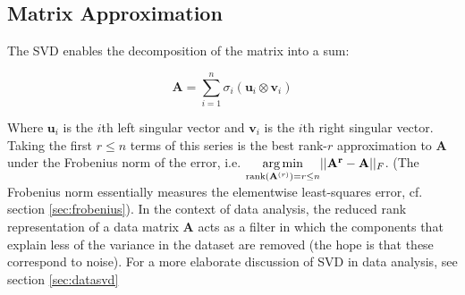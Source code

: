 \subsection{Matrix Approximation}
The SVD enables the decomposition of the matrix into a sum:

\begin{equation}
\mathbf{A} = \sum_{i=1}^n \sigma_i (\mathbf{u}_i \otimes \mathbf{v}_i)
\end{equation}

Where $\mathbf{u}_i$ is the $i$th left singular vector and $\mathbf{v}_i$ is the $i$th right singular vector. Taking the first $r \leq n$ terms of this series is the best rank-$r$ approximation to $\mathbf{A}$ under the Frobenius norm of the error, i.e.  $\underset{\mathrm{rank}(\mathbf{A}^{(r)})=r\leq n}{\operatorname*{arg\,min}} ||\mathbf{A^r}-\mathbf{A}||_F$. (The Frobenius norm essentially measures the elementwise least-squares error, cf. section \ref{sec:frobenius}). In the context of data analysis, the reduced rank representation of a data matrix $\mathbf{A}$ acts as a filter in which the components that explain less of the variance in the dataset are removed (the hope is that these correspond to noise). For a more elaborate discussion of SVD in data analysis, see section \ref{sec:datasvd}